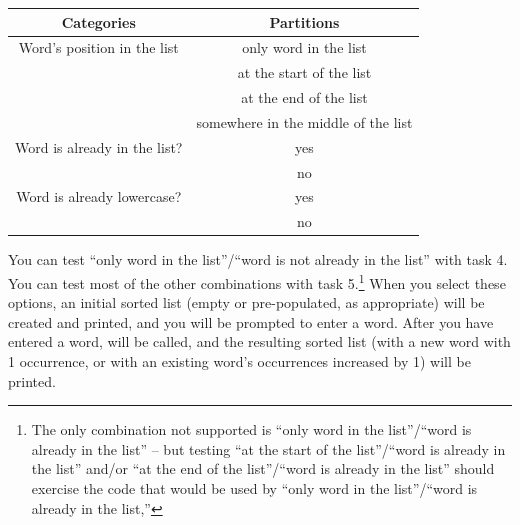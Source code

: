 \begin{center} \begin{tabular}{c|c}
    \textbf{Categories}             & \textbf{Partitions}                   \\ \hline\hline
    Word's position in the list     & only word in the list                 \\
                                    & at the start of the list              \\
                                    & at the end of the list                \\
                                    & somewhere in the middle of the list   \\ \hline
    Word is already in the list?    & yes                                   \\
                                    & no                                    \\ \hline
    Word is already lowercase?      & yes                                   \\
                                    & no
\end{tabular}\end{center}

\begin{description}
\end{description}

You can test ``only word in the list''/``word is not already in the list'' with task 4.
You can test most of the other combinations with task 5.\footnote{The only combination not supported is ``only word in the list''/``word is already in the list'' -- but testing ``at the start of the list''/``word is already in the list'' and/or ``at the end of the list''/``word is already in the list'' should exercise the code that would be used by ``only word in the list''/``word is already in the list,''}
When you select these options, an initial sorted list (empty or pre-populated, as appropriate) will be created and printed, and you will be prompted to enter a word.
After you have entered a word,  will be called, and the resulting sorted list (with a new word with 1 occurrence, or with an existing word's occurrences increased by 1) will be printed.

